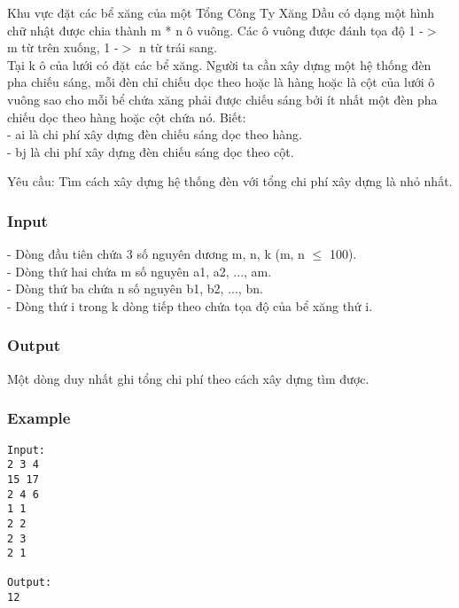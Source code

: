 



   Khu vực đặt các bể xăng của một Tổng Công Ty Xăng Dầu có dạng một hình chữ nhật được chia thành m * n ô vuông. Các ô vuông được đánh tọa độ 1 -$>$ m từ trên xuống, 1 -$>$ n từ trái sang.   
\\   Tại k ô của lưới có đặt các bể xăng. Người ta cần xây dựng một hệ thống đèn pha chiếu sáng, mỗi đèn chỉ chiếu dọc theo hoặc là hàng hoặc là cột của lưới ô vuông sao cho mỗi bể chứa xăng phải được chiếu sáng bởi ít nhất một đèn pha chiếu dọc theo hàng hoặc cột chứa nó. Biết:   
\\   - ai là chi phí xây dựng đèn chiếu sáng dọc theo hàng.   
\\   - bj là chi phí xây dựng đèn chiếu sáng dọc theo cột.  

       Yêu cầu:      Tìm cách xây dựng hệ thống đèn với tổng chi phí xây dựng là nhỏ nhất.  

\subsubsection{   Input  }

   - Dòng đầu tiên chứa 3 số nguyên dương m, n, k (m, n  $\le$  100).   
\\   - Dòng thứ hai chứa m số nguyên a1, a2, ..., am.   
\\   - Dòng thứ ba chứa n số nguyên b1, b2, ..., bn.   
\\   - Dòng thứ i trong k dòng tiếp theo chứa tọa độ của bể xăng thứ i.  

\subsubsection{   Output  }

   Một dòng duy nhất ghi tổng chi phí theo cách xây dựng tìm được.  

\subsubsection{   Example  }
\begin{verbatim}
Input:
2 3 4
15 17
2 4 6
1 1
2 2
2 3
2 1

Output:
12
\end{verbatim}
